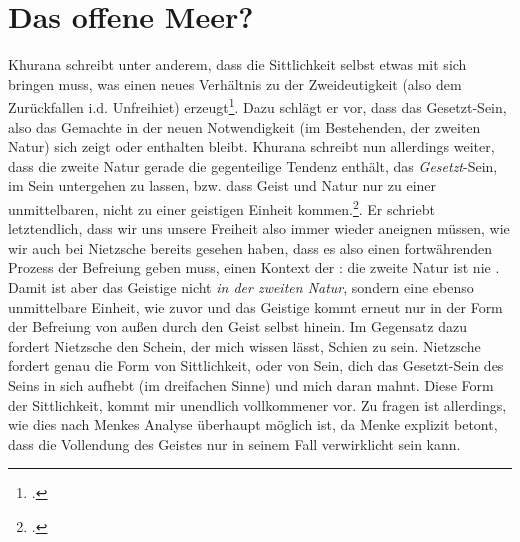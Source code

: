 \documentclass[12pt, a4paper, openany]{report}
\begin{document}
\section{Das offene Meer?}\label{abschnitt_4}
Khurana schreibt unter anderem, dass die Sittlichkeit selbst etwas mit sich bringen muss, was einen neues Verhältnis zu der Zweideutigkeit (also dem Zurückfallen i.d. Unfreihiet) erzeugt\footcite[Vgl.][399]{khurana_freiheit_2017}.
Dazu schlägt er vor, dass das Gesetzt-Sein, also das Gemachte in der neuen Notwendigkeit (im Bestehenden, der zweiten Natur) sich zeigt oder enthalten bleibt. 
Khurana schreibt nun allerdings weiter, dass die zweite Natur gerade die gegenteilige Tendenz enthält, das \emph{Gesetzt}-Sein, im Sein untergehen zu lassen, bzw. dass Geist und Natur nur zu einer unmittelbaren, nicht zu einer geistigen Einheit kommen.\footcite[Vgl.][401]{khurana_freiheit_2017}.
Er schriebt letztendlich, dass wir uns unsere Freiheit also immer wieder aneignen müssen, wie wir auch bei Nietzsche bereits gesehen haben, dass es also einen fortwährenden Prozess der Befreiung geben muss, einen Kontext der : 
die zweite Natur ist nie . 
Damit ist aber das Geistige nicht \emph{in der zweiten Natur}, sondern eine ebenso unmittelbare Einheit, wie zuvor und das Geistige kommt erneut nur in der Form der Befreiung von außen durch den Geist selbst hinein. 
Im Gegensatz dazu fordert Nietzsche den Schein, der mich wissen lässt, Schien zu sein.
Nietzsche fordert genau die Form von Sittlichkeit, oder von Sein, dich das Gesetzt-Sein des Seins in sich aufhebt (im dreifachen Sinne) und mich daran mahnt. 
Diese Form der Sittlichkeit, kommt mir unendlich vollkommener vor.
Zu fragen ist allerdings, wie dies nach Menkes Analyse überhaupt möglich ist, da Menke explizit betont, dass die Vollendung des Geistes nur in seinem Fall verwirklicht sein kann.\\
\end{document}
